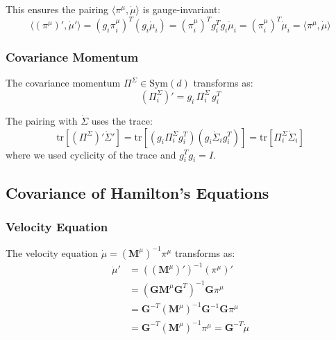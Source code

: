 \documentclass[12pt]{article}
\begin{document}
This ensures the pairing $\langle\pi^\mu, \dot{\mu}\rangle$ is gauge-invariant:
\begin{equation}
\langle(\pi^\mu)', \dot{\mu}'\rangle = (g_i\pi_i^\mu)^T(g_i\dot{\mu}_i) = (\pi_i^\mu)^T g_i^T g_i \dot{\mu}_i = (\pi_i^\mu)^T\dot{\mu}_i = \langle\pi^\mu, \dot{\mu}\rangle
\end{equation}

\subsubsection{Covariance Momentum}

The covariance momentum $\Pi^\Sigma \in \mathrm{Sym}(d)$ transforms as:
\begin{equation}
\boxed{(\Pi_i^\Sigma)' = g_i \, \Pi_i^\Sigma \, g_i^T}
\end{equation}

The pairing with $\dot{\Sigma}$ uses the trace:
\begin{equation}
\mathrm{tr}[(\Pi^\Sigma)'\dot{\Sigma}'] = \mathrm{tr}[(g_i\Pi_i^\Sigma g_i^T)(g_i\dot{\Sigma}_i g_i^T)] = \mathrm{tr}[\Pi_i^\Sigma\dot{\Sigma}_i]
\end{equation}
where we used cyclicity of the trace and $g_i^T g_i = I$.

\subsection{Covariance of Hamilton's Equations}

\subsubsection{Velocity Equation}

The velocity equation $\dot{\mu} = (\mathbf{M}^\mu)^{-1}\pi^\mu$ transforms as:
\begin{align}
\dot{\mu}' &= ((\mathbf{M}^\mu)')^{-1}(\pi^\mu)' \nonumber\\
&= (\mathbf{G}\mathbf{M}^\mu\mathbf{G}^T)^{-1}\mathbf{G}\pi^\mu \nonumber\\
&= \mathbf{G}^{-T}(\mathbf{M}^\mu)^{-1}\mathbf{G}^{-1}\mathbf{G}\pi^\mu \nonumber\\
&= \mathbf{G}^{-T}(\mathbf{M}^\mu)^{-1}\pi^\mu = \mathbf{G}^{-T}\dot{\mu}
\end{align}
\end{document}

